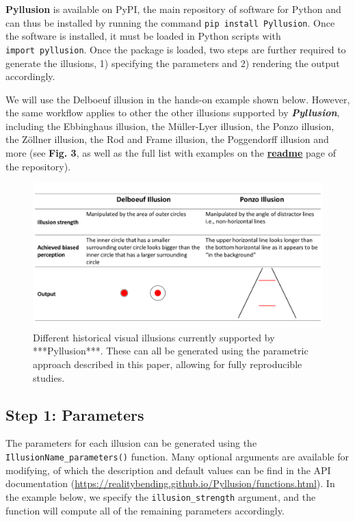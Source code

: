 \documentclass[
  english,
  man,floatsintext]{apa6}
\begin{document}
\textbf{Pyllusion} is available on PyPI, the main repository of software for Python and can thus be installed by running the command \texttt{pip\ install\ Pyllusion}. Once the software is installed, it must be loaded in Python scripts with \texttt{import\ pyllusion}. Once the package is loaded, two steps are further required to generate the illusions, 1) specifying the parameters and 2) rendering the output accordingly.

We will use the Delboeuf illusion in the hands-on example shown below. However, the same workflow applies to other the other illusions supported by \textbf{\emph{Pyllusion}}, including the Ebbinghaus illusion, the Müller-Lyer illusion, the Ponzo illusion, the Zöllner illusion, the Rod and Frame illusion, the Poggendorff illusion and more (see \textbf{Fig. 3}, as well as the full list with examples on the \href{https://github.com/RealityBending/Pyllusion}{\textbf{readme}} page of the repository).

\begin{figure}
\includegraphics[width=1\linewidth]{figure3} \caption{Different historical visual illusions currently supported by ***Pyllusion***. These can all be generated using the parametric approach described in this paper, allowing for fully reproducible studies.}\label{fig:unnamed-chunk-3}
\end{figure}

\hypertarget{step-1-parameters}{%
\subsection{Step 1: Parameters}\label{step-1-parameters}}

The parameters for each illusion can be generated using the \texttt{IllusionName\_parameters()} function. Many optional arguments are available for modifying, of which the description and default values can be find in the API documentation (\url{https://realitybending.github.io/Pyllusion/functions.html}). In the example below, we specify the \texttt{illusion\_strength} argument, and the function will compute all of the remaining parameters accordingly.
\end{document}

